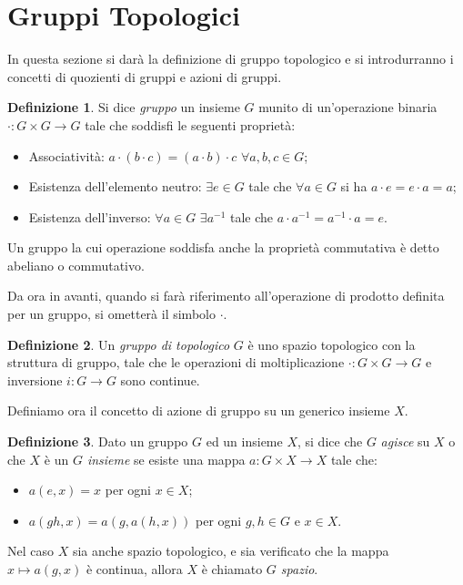 \documentclass[12pt,a4paper]{report}
\theoremstyle{definition}
\newtheorem{Def}{Definizione}[chapter]
\theoremstyle{definition}
\theoremstyle{definition}
\theoremstyle{remark}
\begin{document}
\section{Gruppi Topologici}
In questa sezione si darà la definizione di gruppo topologico e si introdurranno i concetti di quozienti di gruppi e azioni di gruppi.
\begin{Def}
	Si dice \textit{gruppo} un insieme $G$ munito di un'operazione binaria $\cdot:G\times G\rightarrow G$ tale che soddisfi le seguenti proprietà:
	\begin{itemize}
		\item Associatività: $a\cdot (b\cdot c)=(a\cdot b)\cdot c$ $\forall a,b,c\in G$;
		\item Esistenza dell'elemento neutro: $\exists e\in G$ tale che $\forall a\in G$ si ha $a\cdot e=e\cdot a=a$;
		\item Esistenza dell'inverso: $\forall a\in G$ $\exists a^{-1}$ tale che $a\cdot a^{-1}=a^{-1}\cdot a=e$.
	\end{itemize}
	Un gruppo la cui operazione soddisfa anche la proprietà commutativa è detto abeliano o commutativo.
\end{Def}
Da ora in avanti, quando si farà riferimento all'operazione di prodotto definita per un gruppo, si ometterà il simbolo $\cdot$.\\
\begin{Def}
	Un \textit{gruppo di topologico} $G$ è uno spazio topologico con la struttura di gruppo, tale che le operazioni di moltiplicazione $\cdot:G\times G\rightarrow G$ e inversione $i:G\rightarrow G$ sono continue.
\end{Def}
Definiamo ora il concetto di azione di gruppo su un generico insieme $X$.
\begin{Def}
	Dato un gruppo $G$ ed un insieme $X$, si dice che $G$ \textit{agisce} su $X$ o che $X$ è un \textit{$G$ insieme} se esiste una mappa $a:G\times X\rightarrow X$ tale che:
	\begin{itemize}
		\item 	$a(e,x)=x$ per ogni $x\in X$;
		\item $a(gh,x)=a(g,a(h,x))$ per ogni $g,h\in G$ e $x\in X$.
	\end{itemize} 
Nel caso $X$ sia anche spazio topologico, e sia verificato che la mappa $x\longmapsto a(g,x)$ è continua, allora $X$ è chiamato \textit{$G$ spazio}.
\end{Def}
\end{document}

